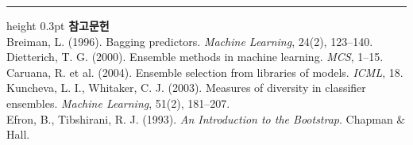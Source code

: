 \documentclass[10pt]{article}
\begin{document}
\vspace{0.6em}
\hrule height 0.3pt
\vspace{0.5em}
{\footnotesize
\textbf{참고문헌}\\[0.3em]
Breiman, L. (1996). Bagging predictors. \emph{Machine Learning}, 24(2), 123--140.\\[0.15em]
Dietterich, T. G. (2000). Ensemble methods in machine learning.
\emph{MCS}, 1--15.\\[0.15em]
Caruana, R. et al. (2004). Ensemble selection from libraries of models.
\emph{ICML}, 18.\\[0.15em]
Kuncheva, L. I., Whitaker, C. J. (2003). Measures of diversity in classifier
ensembles. \emph{Machine Learning}, 51(2), 181--207.\\[0.15em]
Efron, B., Tibshirani, R. J. (1993). \emph{An Introduction to the Bootstrap}.
Chapman \& Hall.
}
\end{document}
